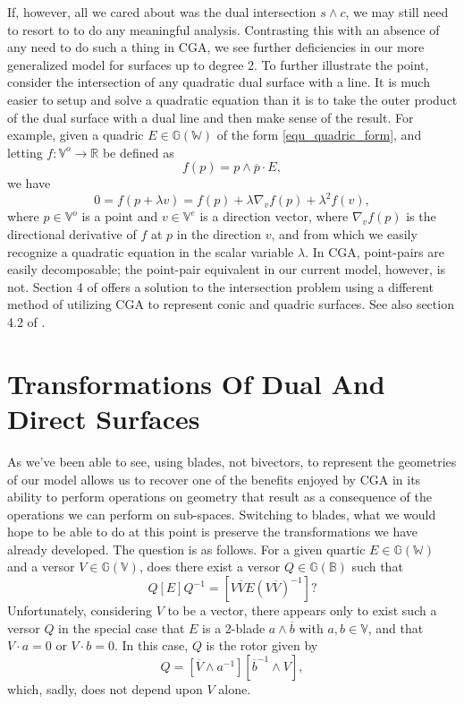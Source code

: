 \documentclass{birkjour}
\theoremstyle{definition}
\theoremstyle{remark}
\numberwithin{equation}{section}
\newcommand{\G}{\mathbb{G}}
\newcommand{\V}{\mathbb{V}}
\newcommand{\W}{\mathbb{W}}
\newcommand{\R}{\mathbb{R}}
\newcommand{\B}{\mathbb{B}}
\begin{document}
If, however, all we cared about was the dual intersection $s\wedge c$, we may still
need to resort to \cite{Wang03} to do any meaningful analysis.
Contrasting this with an absence of any need to do such a thing in CGA,
we see further deficiencies in our more generalized model for surfaces
up to degree 2.
To further illustrate the point, consider the intersection of any quadratic dual surface with a line.
It is much easier to setup and solve a quadratic equation than it is to take the outer
product of the dual surface with a dual line and then make sense of the result.  For example,
given a quadric $E\in\G(\W)$ of the form \eqref{equ_quadric_form}, and
letting $f:\V^o\to\R$ be defined as
\begin{equation}
f(p)=p\wedge\overline{p}\cdot E,
\end{equation}
we have
\begin{equation}
0 = f(p+\lambda v) = f(p)+\lambda \nabla_v f(p)+\lambda^2 f(v),
\end{equation}
where $p\in\V^o$ is a point and $v\in\V^e$ is a direction vector, where
$\nabla_v f(p)$ is the directional derivative of $f$ at $p$ in the direction $v$, and from
which we easily recognize a quadratic equation in the scalar variable $\lambda$.
In CGA, point-pairs are easily decomposable; the point-pair equivalent
in our current model, however, is not.  Section 4 of \cite{Lasenby05} offers
a solution to the intersection problem using a different method of utilizing CGA to
represent conic and quadric surfaces.  See also section 4.2 of \cite{Wareham05}.

\section{Transformations Of Dual And Direct Surfaces}\label{sec_transform_surf}

As we've been able to see, using blades, not bivectors, to represent the geometries
of our model allows us to recover one of the benefits enjoyed by CGA in its ability to
perform operations on geometry that result as a consequence of the
operations we can perform on sub-spaces.  Switching to blades, what we would
hope to be able to do at this point is preserve the transformations we have
already developed.  The question is as follows.  For a given quartic $E\in\G(\W)$
and a versor $V\in\G(\V)$, does there exist a versor $Q\in\G(\B)$ such that
\begin{equation}
Q[E]Q^{-1} = [V\overline{V}E(V\overline{V})^{-1}]?
\end{equation}
Unfortunately, considering $V$ to be a vector,
there appears only to exist such a versor $Q$ in the special
case that $E$ is a 2-blade $a\wedge\overline{b}$ with $a,b\in\V$, and
that $V\cdot a=0$ or $V\cdot b=0$.  In this case, $Q$ is the rotor given by
\begin{equation}
Q = [\overline{V}\wedge a^{-1}][\overline{b}^{-1}\wedge V],
\end{equation}
which, sadly, does not depend upon $V$ alone.
\end{document}
